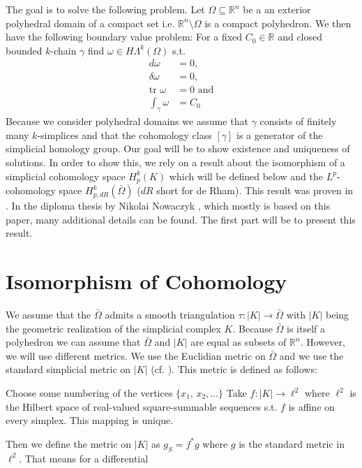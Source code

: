 \documentclass[12pt,a4paper]{article}
\newcommand{\omegabar}{\bar{\Omega}}
\newcommand{\real}{\mathbb{R}}
\begin{document}
The goal is to solve the following problem. Let $\Omega \subseteq \real^n$ be a
an exterior polyhedral domain of a compact set i.e. $\real^n \setminus \Omega$ 
is a compact polyhedron. We then have the following boundary value
problem: For a fixed $C_0 \in \real$ and closed bounded $k$-chain $\gamma$ 
find $\omega \in H\Lambda^k(\Omega)$ s.t.
\begin{align*}
    d\omega &= 0, \\
    \delta\omega &= 0, \\
    \text{tr } \omega &= 0 \text{ and} \\
    \int_\gamma \omega &= C_0
\end{align*}
Because we consider polyhedral domains we assume that $\gamma$ consists of 
finitely many $k$-simplices and that the cohomology class $[\gamma]$ is a 
generator of the simplicial homology group.
Our goal will be to show existence and uniqueness of solutions. In order to show
this, we rely on a result about the isomorphism of a simplicial cohomology 
space $H^k_p(K)$ which will be defined below
and the $L^p$-cohomology space $H^k_{p,dR}(\omegabar)$ ($dR$ short for de Rham).
This result was proven in \cite{goldshtein}. In the diploma thesis by Nikolai
Nowaczyk \cite{nowaczyk}, which mostly is based on this paper, 
many additional details can be found. The first part will be to present this 
result.

\section{Isomorphism of Cohomology}
We assume that the $\omegabar$ admits a smooth triangulation $\tau: |K|
\rightarrow \omegabar$ with $|K|$ being the geometric realization of the
simplicial complex $K$. Because $\omegabar$ is itself a polyhedron we can
assume that $\omegabar$ and $|K|$ are equal as subsets of $\real^n$. 
However, we will use different metrics. We use the Euclidian metric on 
$\omegabar$ and we use the standard simplicial metric on $|K|$ (cf. 
\cite[p.191]{goldshtein}). This metric is defined as follows:

Choose some numbering of the vertices $\{ x_1,\, x_2, ... \}$ 
Take $f: |K| \rightarrow \ell^2$ where $\ell^2$ is the 
Hilbert space of real-valued square-summable sequences s.t. $f$ is affine on 
every simplex. This mapping is unique.%

Then we define the metric on $|K|$ as $g_S = f^*g$ where $g$ is the standard
metric in $\ell^2$. That means for a differential
\end{document}
